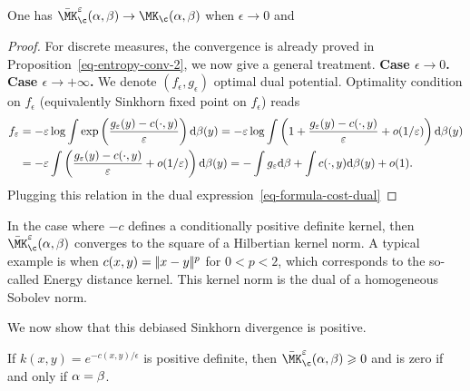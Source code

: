 \begin{prop}
	One has $\bar\MK_\c^\epsilon(\al,\be) \rightarrow \MK_\c(\al,\be)$ when $\epsilon\rightarrow 0$ and
\end{prop}
\begin{proof}For discrete measures, the convergence is already proved in Proposition~\eqref{eq-entropy-conv-2}, we now give a general treatment.
	\textbf{Case $\epsilon \rightarrow 0$.} 
	\textbf{Case $\epsilon \rightarrow +\infty$.} We denote $(f_\epsilon,g_\epsilon)$ optimal dual potential. Optimality condition on $f_\epsilon$ (equivalently Sinkhorn fixed point on $f_\epsilon$) reads
	\begin{align*}
		f_\varepsilon &= -\varepsilon \log \int \exp\left(  \frac{g_\varepsilon(y) - c(\cdot,y)}{\varepsilon}  \right) \mathrm{d} \beta(y)
		=	-\varepsilon \log \int \left(  1 + \frac{g_\varepsilon(y) - c(\cdot,y)}{\varepsilon} + o(1/\varepsilon)  \right) \mathrm{d} \beta(y) \\		
		&=	-\varepsilon \int \left(  \frac{g_\varepsilon(y) - c(\cdot,y)}{\varepsilon} + o(1/\varepsilon)  \right) \mathrm{d} \beta(y)
		= - \int g_\varepsilon \mathrm{d}\beta + \int c(\cdot,y) \mathrm{d} \beta(y) + o(1).  
	\end{align*}
	Plugging this relation in the dual expression~\eqref{eq-formula-cost-dual}
\end{proof}

In the case where $-c$ defines a conditionally positive definite kernel, then $\bar\MK_\c^\epsilon(\al,\be)$ converges to the square of a Hilbertian kernel norm. A typical example is when $c(x,y)=|\!| x-y |\!|^p$ for $0 < p < 2$, which corresponds to the so-called Energy distance kernel. This kernel norm is the dual of a homogeneous Sobolev norm.

We now show that this debiased Sinkhorn divergence is positive.

\begin{prop}
	If $k(x,y)=e^{-c(x,y)/\epsilon}$ is positive definite, then $\bar\MK_\c^\epsilon(\al,\be) \geq 0$ and is zero if and only if $\alpha=\beta$.
\end{prop}

